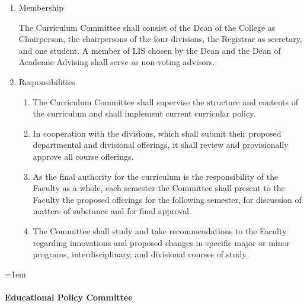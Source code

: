\documentclass{manual}
\let\oldparagraph\paragraph
\renewcommand\paragraph{\leftskip=1em\oldparagraph}
\newcommand{\itemLevelA}{\alph*.}
\newcommand{\itemLevelB}{\arabic*)}
\newcommand{\itemRefA}{\alph*}
\newcommand{\itemRefB}{\arabic*}
\begin{document}
\begin{enumerate}[label=\itemLevelA,ref=\itemRefA]
\item Membership

The Curriculum Committee shall consist of the Dean of the College as Chairperson, the chairpersons of the four divisions, the Registrar as secretary, and one student. A member of LIS chosen by the Dean and the Dean of Academic Advising shall serve as non-voting advisors.

\item Responsibilities
\begin{enumerate}[label=\itemLevelB,ref=\itemRefB]
\item The Curriculum Committee shall supervise the structure and contents of the curriculum and shall implement current curricular policy.
\item In cooperation with the divisions, which shall submit their proposed departmental and divisional offerings, it shall review and provisionally approve all course offerings.
\item As the final authority for the curriculum is the responsibility of the Faculty as a whole, each semester the Committee shall present to the Faculty the proposed offerings for the following semester, for discussion of matters of substance and for final approval.
\item The Committee shall study and take recommendations to the Faculty regarding innovations and proposed changes in specific major or minor programs, interdisciplinary, and divisional courses of study.

\end{enumerate}
\end{enumerate}

\paragraph{Educational Policy Committee}
\end{document}
